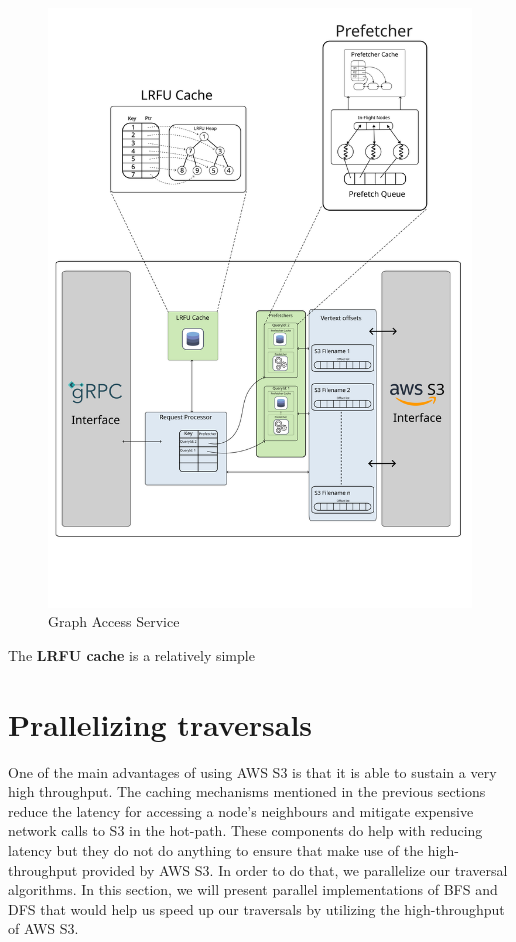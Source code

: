 \begin{figure}[ht]
    \centering
    \includegraphics[width=\textwidth]{figures/graphAccessServiceFinal.png}
    \caption{Graph Access Service}
    \label{fig:graphAccessArch}
\end{figure}

\medskip
The \textbf{LRFU cache} is a relatively simple 

\section{Prallelizing traversals}\label{sec:parallelAlgorithms}
One of the main advantages of using AWS S3 is that it is able to sustain a very
high throughput. The caching mechanisms mentioned in the previous sections
reduce the latency for accessing a node's neighbours and mitigate expensive
network calls to S3 in the hot-path. These components do help with reducing
latency but they do not do anything to ensure that make use of the
high-throughput provided by AWS S3. In order to do that, we parallelize our
traversal algorithms. In this section, we will present parallel implementations
of BFS and DFS that would help us speed up our traversals by utilizing the
high-throughput of AWS S3.

